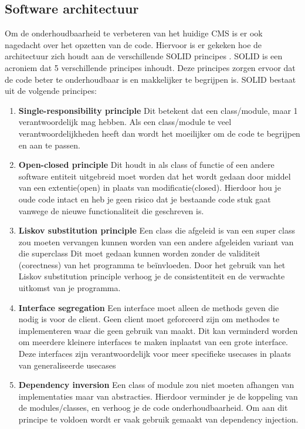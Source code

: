 \subsection{Software architectuur}
Om de onderhoudbaarheid te verbeteren van het huidige CMS is er ook nagedacht over het opzetten van de code.
Hiervoor is er gekeken hoe de architectuur zich houdt aan de verschillende SOLID principes \parencite{SOLID}. 
SOLID is een acroniem dat 5 verschillende principes inhoudt.
Deze principes zorgen ervoor dat de code beter te onderhoudbaar is en makkelijker te begrijpen is.
SOLID bestaat uit de volgende principes:

\begin{enumerate}
    \item \textbf{Single-responsibility principle}
    Dit betekent dat een class\slash module, maar 1 verantwoordelijk mag hebben.
    Als een class\slash module te veel verantwoordelijkheden heeft dan wordt het moeilijker om de code te begrijpen en aan te passen.

    \item \textbf{Open-closed principle}
    Dit houdt in als class of functie of een andere software entiteit uitgebreid moet worden dat het wordt gedaan door middel van een extentie(open) in plaats van modificatie(closed).
    Hierdoor hou je oude code intact en heb je geen risico dat je bestaande code stuk gaat vanwege de nieuwe functionaliteit die geschreven is. 
        
    \item \textbf{Liskov substitution principle}
    Een class die afgeleid is van een super class zou moeten vervangen kunnen worden van een andere afgeleiden variant van die superclass
    Dit moet gedaan kunnen worden zonder de validiteit (corectness) van het programma te beïnvloeden.
    Door het gebruik van het Liskov substitution principle verhoog je de consistentiteit en de verwachte uitkomst van je programma.

    \item \textbf{Interface segregation} 
    Een interface moet alleen de methods geven die nodig is voor de client. 
    Geen client moet geforceerd zijn om methodes te implementeren waar die geen gebruik van maakt.
    Dit kan verminderd worden om meerdere kleinere interfaces te maken inplaatst van een grote interface.
    Deze interfaces zijn verantwoordelijk voor meer specifieke usecases in plaats van generaliseerde usecases

    \item \textbf{Dependency inversion} 
    Een class of module zou niet moeten afhangen van implementaties maar van abstracties.
    Hierdoor verminder je de koppeling van de modules/classes, en verhoog je de code onderhoudbaarheid.
    Om aan dit principe te voldoen wordt er vaak gebruik gemaakt van dependency injection.
\end{enumerate}

